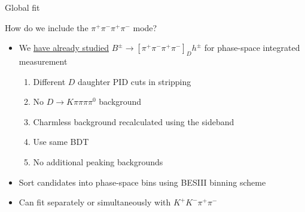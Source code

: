 \documentclass[xcolor={dvipsnames}]{beamer}
\begin{document}
\begin{frame}{Global fit}
  \begin{center}
    {\large How do we include the $\pi^+\pi^-\pi^+\pi^-$ mode?}
  \end{center}
  \begin{itemize}
    \setlength\itemsep{1.5em}
    \item{We \underline{have already studied} $B^\pm\to[\pi^+\pi^-\pi^+\pi^-]_Dh^\pm$ for phase-space integrated measurement}
    \begin{enumerate}
      \setlength\itemsep{0.5em}
      \item{Different $D$ daughter PID cuts in stripping}
      \item{No $D\to K\pi\pi\pi\pi^0$ background}
      \item{Charmless background recalculated using the sideband}
      \item{Use same BDT}
      \item{No additional peaking backgrounds}
    \end{enumerate}
    \item{Sort candidates into phase-space bins using BESIII binning scheme}
    \item{Can fit separately or simultaneously with $K^+K^-\pi^+\pi^-$}
  \end{itemize}
\end{frame}
\end{document}
